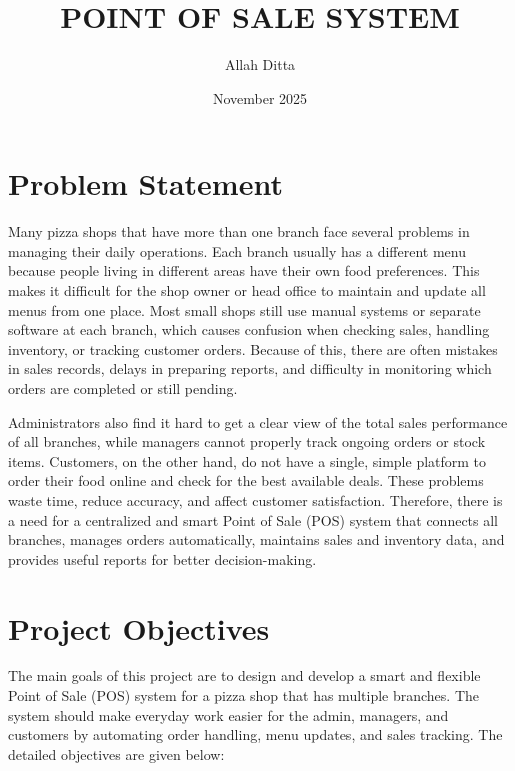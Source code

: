 \documentclass{article}
\title{POINT OF SALE SYSTEM}
\author{Allah Ditta  }
\date{November 2025}
\begin{document}
\maketitle

\section{Problem Statement}

Many pizza shops that have more than one branch face several problems in managing their daily operations. 
Each branch usually has a different menu because people living in different areas have their own food preferences. 
This makes it difficult for the shop owner or head office to maintain and update all menus from one place. 
Most small shops still use manual systems or separate software at each branch, which causes confusion when checking sales, handling inventory, or tracking customer orders. 
Because of this, there are often mistakes in sales records, delays in preparing reports, and difficulty in monitoring which orders are completed or still pending. 

Administrators also find it hard to get a clear view of the total sales performance of all branches, while managers cannot properly track ongoing orders or stock items. 
Customers, on the other hand, do not have a single, simple platform to order their food online and check for the best available deals. 
These problems waste time, reduce accuracy, and affect customer satisfaction. 
Therefore, there is a need for a centralized and smart Point of Sale (POS) system that connects all branches, manages orders automatically, maintains sales and inventory data, and provides useful reports for better decision-making.


\section{Project Objectives}

The main goals of this project are to design and develop a smart and flexible Point of Sale (POS) system for a pizza shop that has multiple branches. 
The system should make everyday work easier for the admin, managers, and customers by automating order handling, menu updates, and sales tracking. 
The detailed objectives are given below:
\end{document}
